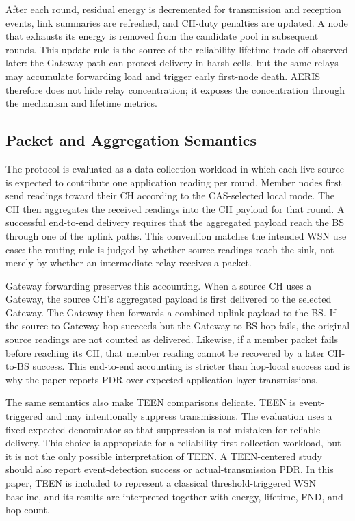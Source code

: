 \documentclass[conference]{IEEEtran}
\begin{document}
After each round, residual energy is decremented for transmission and reception events, link summaries are refreshed, and CH-duty penalties are updated. A node that exhausts its energy is removed from the candidate pool in subsequent rounds. This update rule is the source of the reliability-lifetime trade-off observed later: the Gateway path can protect delivery in harsh cells, but the same relays may accumulate forwarding load and trigger early first-node death. AERIS therefore does not hide relay concentration; it exposes the concentration through the mechanism and lifetime metrics.

\subsection{Packet and Aggregation Semantics}
The protocol is evaluated as a data-collection workload in which each live source is expected to contribute one application reading per round. Member nodes first send readings toward their CH according to the CAS-selected local mode. The CH then aggregates the received readings into the CH payload for that round. A successful end-to-end delivery requires that the aggregated payload reach the BS through one of the uplink paths. This convention matches the intended WSN use case: the routing rule is judged by whether source readings reach the sink, not merely by whether an intermediate relay receives a packet.

Gateway forwarding preserves this accounting. When a source CH uses a Gateway, the source CH's aggregated payload is first delivered to the selected Gateway. The Gateway then forwards a combined uplink payload to the BS. If the source-to-Gateway hop succeeds but the Gateway-to-BS hop fails, the original source readings are not counted as delivered. Likewise, if a member packet fails before reaching its CH, that member reading cannot be recovered by a later CH-to-BS success. This end-to-end accounting is stricter than hop-local success and is why the paper reports PDR over expected application-layer transmissions.

The same semantics also make TEEN comparisons delicate. TEEN is event-triggered and may intentionally suppress transmissions. The evaluation uses a fixed expected denominator so that suppression is not mistaken for reliable delivery. This choice is appropriate for a reliability-first collection workload, but it is not the only possible interpretation of TEEN. A TEEN-centered study should also report event-detection success or actual-transmission PDR. In this paper, TEEN is included to represent a classical threshold-triggered WSN baseline, and its results are interpreted together with energy, lifetime, FND, and hop count.
\end{document}

